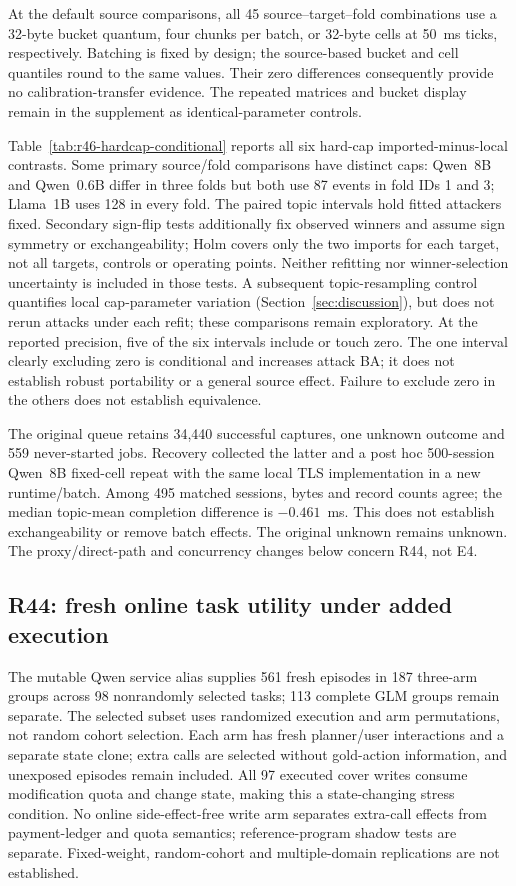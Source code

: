 At the default source comparisons, all 45 source--target--fold combinations use a 32-byte bucket quantum, four chunks per batch, or 32-byte cells at 50~ms ticks, respectively. Batching is fixed by design; the source-based bucket and cell quantiles round to the same values. Their zero differences consequently provide no calibration-transfer evidence. The repeated matrices and bucket display remain in the supplement as identical-parameter controls.

Table~\ref{tab:r46-hardcap-conditional} reports all six hard-cap imported-minus-local contrasts. Some primary source/fold comparisons have distinct caps: Qwen~8B and Qwen~0.6B differ in three folds but both use 87 events in fold IDs 1 and 3; Llama~1B uses 128 in every fold. The paired topic intervals hold fitted attackers fixed. Secondary sign-flip tests additionally fix observed winners and assume sign symmetry or exchangeability; Holm covers only the two imports for each target, not all targets, controls or operating points. Neither refitting nor winner-selection uncertainty is included in those tests. A subsequent topic-resampling control quantifies local cap-parameter variation (Section~\ref{sec:discussion}), but does not rerun attacks under each refit; these comparisons remain exploratory. At the reported precision, five of the six intervals include or touch zero. The one interval clearly excluding zero is conditional and increases attack BA; it does not establish robust portability or a general source effect. Failure to exclude zero in the others does not establish equivalence.


The original queue retains 34,440 successful captures, one unknown outcome and 559 never-started jobs. Recovery collected the latter and a post hoc 500-session Qwen~8B fixed-cell repeat with the same local TLS implementation in a new runtime/batch. Among 495 matched sessions, bytes and record counts agree; the median topic-mean completion difference is $-0.461$~ms. This does not establish exchangeability or remove batch effects. The original unknown remains unknown. The proxy/direct-path and concurrency changes below concern R44, not E4.

\subsection{R44: fresh online task utility under added execution}
The mutable Qwen service alias supplies 561 fresh episodes in 187 three-arm groups across 98 nonrandomly selected tasks; 113 complete GLM groups remain separate. The selected subset uses randomized execution and arm permutations, not random cohort selection. Each arm has fresh planner/user interactions and a separate state clone; extra calls are selected without gold-action information, and unexposed episodes remain included. All 97 executed cover writes consume modification quota and change state, making this a state-changing stress condition. No online side-effect-free write arm separates extra-call effects from payment-ledger and quota semantics; reference-program shadow tests are separate. Fixed-weight, random-cohort and multiple-domain replications are not established.

